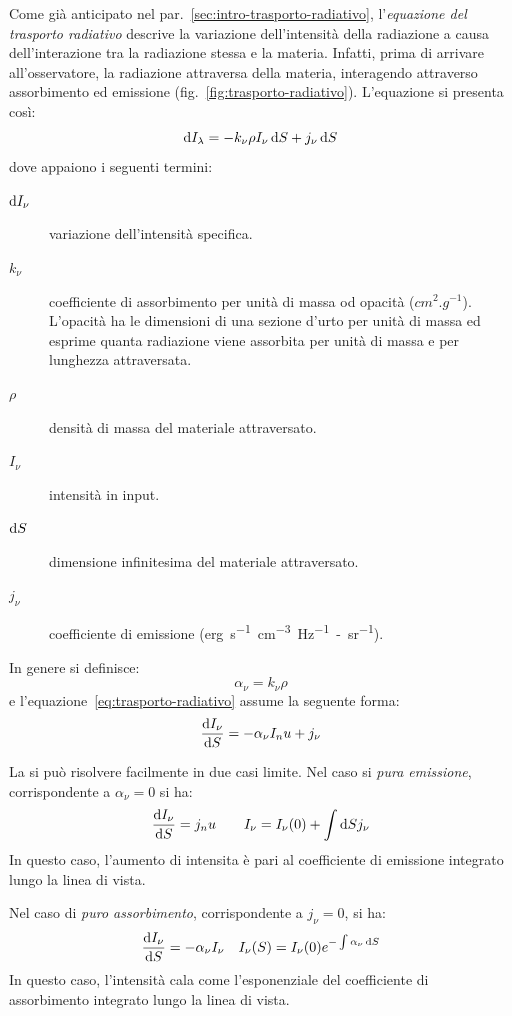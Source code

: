 Come già anticipato nel par.~\ref{sec:intro-trasporto-radiativo}, l'\emph{equazione del trasporto radiativo} descrive la variazione dell'intensità della radiazione a causa dell'interazione tra la radiazione stessa e la materia. Infatti, prima di arrivare all'osservatore, la radiazione attraversa della materia, interagendo attraverso assorbimento ed emissione (fig.~\ref{fig:trasporto-radiativo}). L'equazione si presenta così:
\begin{equation}\label{eq:trasporto-radiativo}
    \mathop{\mathrm{{}d}}\mathopen{} I_\lambda = - k_\nu \rho I_\nu \mathop{\mathrm{{}d}}\mathopen{} S + j_\nu \mathop{\mathrm{{}d}}\mathopen{} S
\end{equation}
dove appaiono i seguenti termini:
\begin{description}
    \item[$\mathop{\mathrm{{}d}}\mathopen{} I_\nu$] variazione dell'intensità specifica.
    \item[$k_\nu$] coefficiente di assorbimento per unità di massa od opacità ($\si{cm^2.g^{-1}}$). L'opacità ha le dimensioni di una sezione d'urto per unità di massa ed esprime quanta radiazione viene assorbita per unità di massa e per lunghezza attraversata.
    \item[$\rho$] densità di massa del materiale attraversato.
    \item[$I_\nu$] intensità in input.
    \item[$\mathop{\mathrm{{}d}}\mathopen{} S$] dimensione infinitesima del materiale attraversato.
    \item[$j_\nu$] coefficiente di emissione (\si{erg.s^{-1}.cm^{-3}.Hz^{-1}-sr^{-1}}).
\end{description}

In genere si definisce:
\[
\alpha_\nu = k_\nu \rho
\]
e l'equazione~\eqref{eq:trasporto-radiativo} assume la seguente forma:
\begin{equation}\label{eq:trasporto-radiativo2}
    \frac{\mathop{\mathrm{{}d}}\mathopen{} I_\nu}{\mathop{\mathrm{{}d}}\mathopen{} S} = -\alpha_\nu I_nu + j_\nu
\end{equation}

La si può risolvere facilmente in due casi limite. Nel caso si \emph{pura emissione}, corrispondente a $\alpha_\nu = 0$ si ha:
\[
    \frac{\mathop{\mathrm{{}d}}\mathopen{} I_\nu}{\mathop{\mathrm{{}d}}\mathopen{} S} = j_nu \qquad I_\nu = I_\nu (0) + \int \mathop{\mathrm{{}d}}\mathopen{} S j_\nu
\]
In questo caso, l'aumento di intensita è pari al coefficiente di emissione integrato lungo la linea di vista.

Nel caso di \emph{puro assorbimento}, corrispondente a $j_\nu = 0$, si ha:
\[
\frac{\mathop{\mathrm{{}d}}\mathopen{} I_\nu}{\mathop{\mathrm{{}d}}\mathopen{} S} = -\alpha_\nu I_\nu \quad 
I_\nu (S) = I_\nu (0) e^{-\int \alpha_\nu \mathop{\mathrm{{}d}}\mathopen{} S}
\]
In questo caso, l'intensità cala come l'esponenziale del coefficiente di assorbimento integrato lungo la linea di vista.

